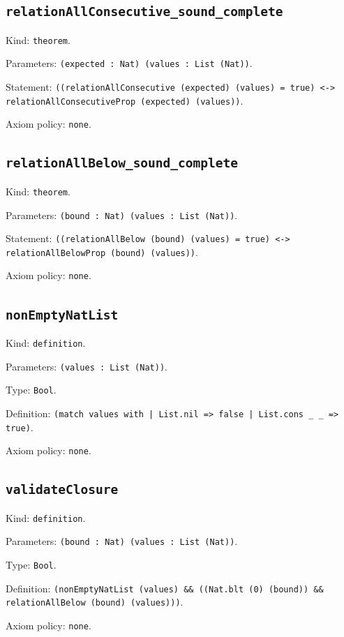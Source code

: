\documentclass[11pt]{article}
\begin{document}
\subsection*{\texttt{relationAllConsecutive\_sound\_complete}}
\noindent Kind: \texttt{theorem}.\par
\noindent Parameters: \texttt{(expected : Nat) (values : List (Nat))}.\par
\noindent Statement: \texttt{((relationAllConsecutive (expected) (values) = true) <-> relationAllConsecutiveProp (expected) (values))}.\par
\noindent Axiom policy: \texttt{none}.\par
\subsection*{\texttt{relationAllBelow\_sound\_complete}}
\noindent Kind: \texttt{theorem}.\par
\noindent Parameters: \texttt{(bound : Nat) (values : List (Nat))}.\par
\noindent Statement: \texttt{((relationAllBelow (bound) (values) = true) <-> relationAllBelowProp (bound) (values))}.\par
\noindent Axiom policy: \texttt{none}.\par
\subsection*{\texttt{nonEmptyNatList}}
\noindent Kind: \texttt{definition}.\par
\noindent Parameters: \texttt{(values : List (Nat))}.\par
\noindent Type: \texttt{Bool}.\par
\noindent Definition: \texttt{(match values with | List.nil => false | List.cons \_ \_ => true)}.\par
\noindent Axiom policy: \texttt{none}.\par
\subsection*{\texttt{validateClosure}}
\noindent Kind: \texttt{definition}.\par
\noindent Parameters: \texttt{(bound : Nat) (values : List (Nat))}.\par
\noindent Type: \texttt{Bool}.\par
\noindent Definition: \texttt{(nonEmptyNatList (values) \&\& ((Nat.blt (0) (bound)) \&\& relationAllBelow (bound) (values)))}.\par
\noindent Axiom policy: \texttt{none}.\par
\end{document}
